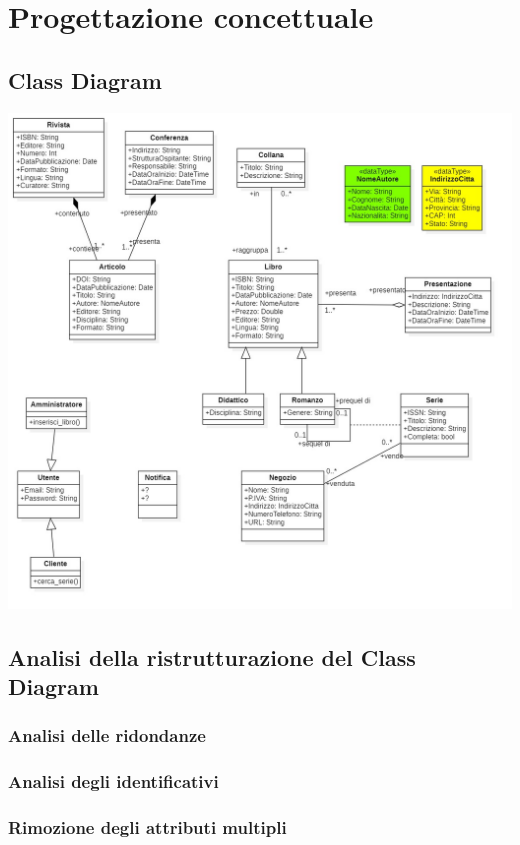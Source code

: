\chapter{Progettazione concettuale}
    \section{Class Diagram}

    \includegraphics[scale=0.3]{Immagini/UMLv5.png}
        
    \section{Analisi della ristrutturazione del Class Diagram}
        
        \subsection{Analisi delle ridondanze}
            
        \subsection{Analisi degli identificativi}
            
        \subsection{Rimozione degli attributi multipli}
            
